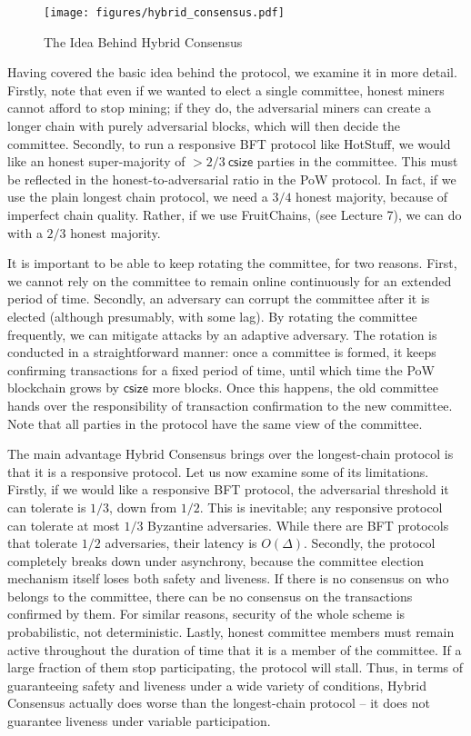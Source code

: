 \documentclass{article}
\begin{document}
\begin{figure}[htbp]
    \centering
    \texttt{[image: figures/hybrid\_consensus.pdf]}
    \caption{The Idea Behind {\sf Hybrid Consensus}}
    \label{fig:hybrid_consensus}
\end{figure}

Having covered the basic idea behind the protocol, we examine it in more detail. Firstly, note that even if we wanted to elect a single committee, honest miners cannot afford to stop mining; if they do, the adversarial miners can create a longer chain with purely adversarial blocks, which will then decide the committee. Secondly, to run a responsive BFT protocol like HotStuff, we would like an honest super-majority of $> 2/3~\textsf{csize}$ parties in the committee. This must be reflected in the honest-to-adversarial ratio in the PoW protocol. In fact, if we use the plain longest chain  protocol, we need a $3/4$ honest majority, because of imperfect chain quality.  Rather, if we use FruitChains, (see Lecture 7), we can do with a $2/3$  honest majority.

It is important to be able to  keep rotating the committee, for two reasons. First, we cannot rely on the committee to remain online continuously for an extended period of time. Secondly, an adversary can corrupt the committee after it is elected (although presumably, with some lag). By rotating the committee frequently, we can mitigate attacks by an adaptive adversary. The rotation is conducted in a  straightforward manner:  once a committee is formed, it keeps confirming transactions for a fixed period of time, until which time the PoW blockchain grows by $\textsf{csize}$ more blocks. Once this happens, the old committee hands over the responsibility of transaction confirmation to the new committee. Note that all parties in the protocol have the same view of the committee. 

The main advantage {\sf Hybrid Consensus} brings over the longest-chain protocol is that it is a responsive protocol. Let us now examine some of its limitations. Firstly, if we would like a responsive BFT protocol, the adversarial threshold it can tolerate is $1/3$, down from $1/2$. This is inevitable; any responsive protocol can tolerate at most $1/3$ Byzantine adversaries. While there are BFT protocols that tolerate $1/2$ adversaries, their latency is $O(\Delta)$. Secondly, the protocol completely breaks down under asynchrony, because the committee election mechanism itself loses both safety and liveness. If there is no consensus on who belongs to the committee, there can be no consensus on the transactions confirmed by them. For similar reasons, security of the whole scheme is probabilistic, not deterministic. Lastly, honest committee members must remain active throughout the duration of time that it is a member of the committee. If a large fraction of them stop participating, the protocol will stall. Thus, in terms of guaranteeing safety and liveness under a wide variety of conditions, {\sf Hybrid Consensus} actually does worse than the longest-chain protocol -- it does not guarantee liveness under variable participation.
\end{document}
